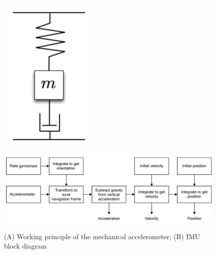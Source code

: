 \begin{figure}[H]
  \centering
  \begin{minipage}[b]{0.15\textwidth}
    \includegraphics[width=\textwidth]{smd.png}
    \label{(a)}
  \end{minipage}
  \hfill
  \begin{minipage}[b]{0.7\textwidth}
    \includegraphics[width=\textwidth]{IMU.png}
    \label{(b)}
  \end{minipage}
\caption{(A) Working principle of the mechanical accelerometer; (B) IMU block diagram \cite{dudek2008inertial}}
\end{figure}

